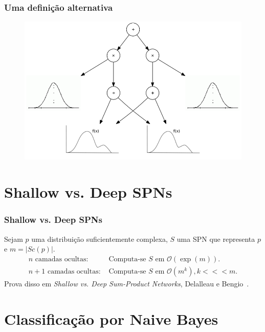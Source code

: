 \documentclass[10pt]{beamer}
\theoremstyle{plain}
\newcommand{\bigo}{\mathcal{O}}
\begin{document}
\begin{frame}
  \frametitle{Uma definição alternativa}
  \begin{figure}[h]
    \centering\includegraphics[scale=0.3]{graphs/alt_spn.png}
  \end{figure}
\end{frame}


\section[Deep SPNs]{Shallow vs. Deep SPNs}

\begin{frame}
  \frametitle{Shallow vs. Deep SPNs}
  Sejam $p$ uma distribuição suficientemente complexa, $S$ uma SPN que representa $p$ e
  $m=|Sc(p)|$.
  \begin{align*}
    n\text{~camadas ocultas:~}&\text{Computa-se $S$ em $\bigo(\exp(m))$.}\\
    n+1\text{~camadas ocultas:~}&\text{Computa-se $S$ em $\bigo(m^k), k<<<m$.}
  \end{align*}
  Prova disso em \textit{Shallow vs. Deep Sum-Product Networks}, Delalleau e
  Bengio~\cite{shallow-vs-deep}.
\end{frame}


\section{Classificação por Naive Bayes}
\end{document}
